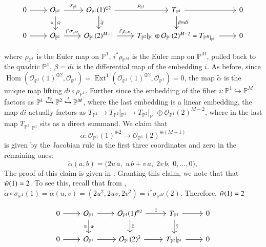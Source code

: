 \documentclass[11pt,twoside]{amsart}
\theoremstyle{plain}
\numberwithin{equation}{section}
\theoremstyle{definition}
\newcommand{\PP}{\mathbb{P}}
\newcommand{\OO}{\mathcal{O}}
\begin{document}
\color{blue}

\[
\begin{tikzcd}
  0 \arrow[r] & \mathcal{O}_{\mathbb{P}^1} \arrow[r, "\sigma_{\mathbb{P}^1}"] \arrow[d, "\Bar{w}", "\cong"'] & \mathcal{O}_{\mathbb{P}^1}(1)^{\oplus 2} \arrow[r, "\rho_{\mathbb{P}^1}"] \arrow[d, "\widetilde{\alpha}"] & T_{\mathbb{P}^1} \arrow[r] \arrow[d, "\beta = di"] & 0 \\
   0 \arrow[r] & \mathcal{O}_{\mathbb{P}^1} \arrow[r, "i^*\sigma_{\mathbb{P}^M}"] & \mathcal{O}_{\mathbb{P}^1}(2)^{M+1} \arrow[r, "i^*\rho_{\mathbb{P}^M}"] & T_{\mathbb{P}^2}|_{\mathbb{P}^1} \oplus \mathcal{O}_{\mathbb{P}^1}(2)^{M-2} = T_{\mathbb{P}^M|_{\mathbb{P}^1}} \arrow[r] & 0
\end{tikzcd}
\]

where $\rho_{\mathbb{P}^1}$ is the Euler map on $\mathbb{P}^1$, $i^*\rho_{\mathbb{P}^M}$ is the Euler map on $\mathbb{P}^M$, pulled back to the quadric $\mathbb{P}^1$, $\beta = di$ is the differential map of the embedding $i$. 
As before, since $\operatorname{Hom}(\mathcal{O}_{\mathbb{P}^1}(1)^{\oplus 2}, \mathcal{O}_{\mathbb{P}^1}) = \operatorname{Ext}^1(\mathcal{O}_{\mathbb{P}^1}(1)^{\oplus 2}, \mathcal{O}_{\mathbb{P}^1}) = 0$, the map $\widetilde{\alpha}$ is the unique map lifting $di \circ \rho_{\mathbb{P}^1}$. Further since the embedding of the fiber $i: \mathbb{P}^1 \hookrightarrow \mathbb{P}^{M}$ factors as $\mathbb{P}^1 \xhookrightarrow{\nu_2} \mathbb{P}^2 \xhookrightarrow{\iota} \mathbb{P}^{M}$, where the last embedding is a linear embedding, the map $di$ actually factors as $T_{\mathbb{P}^1} \to T_{\mathbb{P}^2}|_{\mathbb{P}^1} \to T_{\mathbb{P}^2}|_{\mathbb{P}^1} \oplus \mathcal{O}_{\mathbb{P}^1}(2)^{M-2}$, where in the last map $T_{\mathbb{P}^2}|_{\mathbb{P}^1}$ sits as a direct summand. 
We claim that 
\[
\widetilde\alpha:\OO_{\PP^1}(1)^{\oplus 2}\longrightarrow \OO_{\PP^1}(2)^{\oplus (M+1)}
\]
is given by the Jacobian rule in the first three coordinates and zero in the remaining ones:
\[
\widetilde\alpha(a,b)=\bigl(2u\,a,\;u\,b+v\,a,\;2v\,b,\;0,\dots,0\bigr),
\]
The proof of this claim is given in . Granting this claim, we note that that $\Bar{w}(1) = 2$. To see this, recall that from , $\widetilde{\alpha} \circ \sigma_{\mathbb{P}^1}(1) = \widetilde{\alpha}(u,v) = (2u^2, 2uv, 2v^2) = i^*\sigma_{\mathbb{P}^M}(2)$. Therefore, $\Bar{w}(1) = 2$
 



\color{black}

\[
\begin{tikzcd}
  0 \arrow[r] & \mathcal{O}_{\mathbb{P}^1} \arrow[r] \arrow[d, "\Bar{w}", "\cong"'] & \mathcal{O}_{\mathbb{P}^1}(1)^{\oplus 2} \arrow[r, "\Bar{x}"] \arrow[d, "\Bar{z}"] & T_{\mathbb{P}^1} \arrow[r] \arrow[d, "\Bar{y}"] & 0 \\
   0 \arrow[r] & \mathcal{O}_{\mathbb{P}^1} \arrow[r] & \mathcal{O}_{\mathbb{P}^1}(2)^{3} \arrow[r] & T_{\mathbb{P}^2}|_{\mathbb{P}^1} \arrow[r] & 0
\end{tikzcd}
\]
\end{document}

